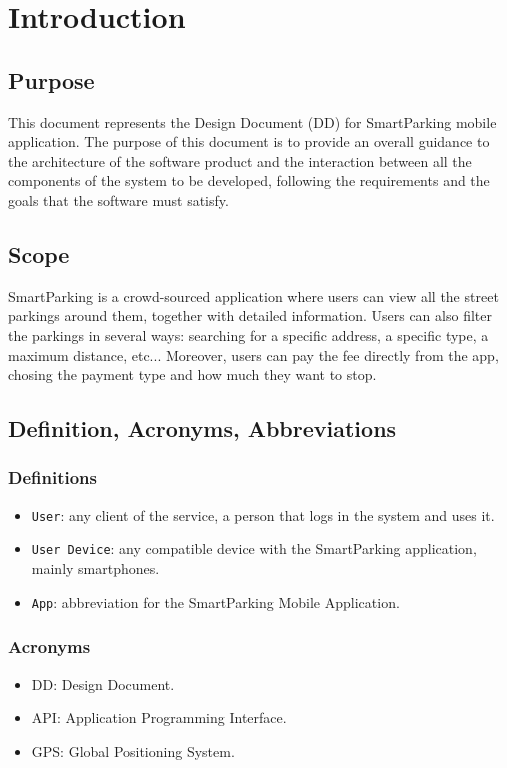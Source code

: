 \documentclass[11pt]{article} %
\begin{document}
\section{Introduction}

\subsection{Purpose}
This document represents the Design Document (DD) for SmartParking mobile application. The purpose of this document is to provide an overall guidance to the architecture of the software product and the interaction between all the components of the system to be developed, following the requirements and the goals that the software must satisfy.

\subsection{Scope}
SmartParking is a crowd-sourced application where users can view all the street parkings around them, together with detailed information. Users can also filter the parkings in several ways: searching for a specific address, a specific type, a maximum distance, etc... Moreover, users can pay the fee directly from the app, chosing the payment type and how much they want to stop.

\subsection{Definition, Acronyms, Abbreviations}

\subsubsection{Definitions}
\begin{itemize}
\item \texttt{User}: any client of the service, a person that logs in the system and uses it.
\item \texttt{User Device}: any compatible device with the SmartParking application, mainly smartphones.
\item \texttt{App}: abbreviation for the SmartParking Mobile Application.
\end{itemize}

\subsubsection{Acronyms}
\begin{itemize}
\item DD: Design Document.
\item API: Application Programming Interface.
\item GPS: Global Positioning System.
\end{itemize}
\end{document}
